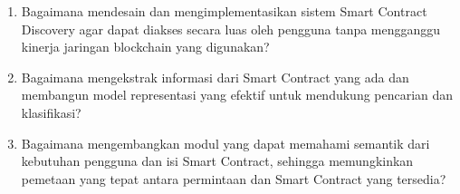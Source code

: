 \begin{enumerate}
  \item Bagaimana mendesain dan mengimplementasikan sistem Smart Contract Discovery agar dapat diakses secara luas oleh pengguna tanpa mengganggu kinerja jaringan blockchain yang digunakan?
  \item Bagaimana mengekstrak informasi dari Smart Contract yang ada dan membangun model representasi yang efektif untuk mendukung pencarian dan klasifikasi?
  \item Bagaimana mengembangkan modul yang dapat memahami semantik dari kebutuhan pengguna dan isi Smart Contract, sehingga memungkinkan pemetaan yang tepat antara permintaan dan Smart Contract yang tersedia?
\end{enumerate}



